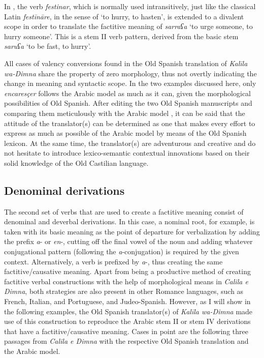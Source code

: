\documentclass[output=paper]{langscibook}
\begin{document}
In , the verb \textit{festinar}, which is normally used intransitively, just like the classical Latin \textit{festīnāre}, in the sense of ‘to hurry, to hasten’, is extended to a divalent scope in order to translate the factitive meaning of \textit{sarraʕa} ‘to urge someone, to hurry someone’. This is a stem II verb pattern, derived from the basic stem \textit{saruʕa} ‘to be fast, to hurry’. 

All cases of valency conversions found in the Old Spanish translation of \textit{Kalīla wa-Dimna} share the property of zero morphology, thus not overtly indicating the change in meaning and syntactic scope. In the two examples discussed here, only \textit{encaresçer} follows the Arabic model as much as it can, given the morphological possibilities of Old Spanish. After editing the two Old Spanish manuscripts and comparing them meticulously with the Arabic model \citep{dohla_libro_2009}, it can be said that the attitude of the translator(s) can be determined as one that makes every effort to express as much as possible of the Arabic model by means of the Old Spanish lexicon. At the same time, the translator(s) are adventurous and creative and do not hesitate to introduce lexico-semantic contextual innovations based on their solid knowledge of the Old Castilian language.

\largerpage
\subsection{Denominal derivations}\label{dohla:sec:5.2}
The second set of verbs that are used to create a factitive meaning consist of denominal and deverbal derivations. In this case, a nominal root, for example, is taken with its basic meaning as the point of departure for verbalization by adding the prefix \textit{a}- or \textit{en}-, cutting off the final vowel of the noun and adding whatever conjugational pattern (following the \textit{a}-conjugation) is required by the given context. Alternatively, a verb is prefixed by \textit{a}-, thus creating the same factitive/causative meaning. Apart from being a productive method of creating factitive verbal constructions with the help of morphological means in \textit{Calila e Dimna}, both strategies are also present in other Romance languages, such as French, Italian, and Portuguese, and Judeo-Spanish. However, as I will show in the following examples, the Old Spanish translator(s) of \textit{Kalīla wa-Dimna} made use of this construction to reproduce the Arabic stem II or stem IV derivations that have a factitive/causative meaning. Cases in point are the following three passages from \textit{Calila e Dimna} with the respective Old Spanish translation and the Arabic model.
\end{document}
